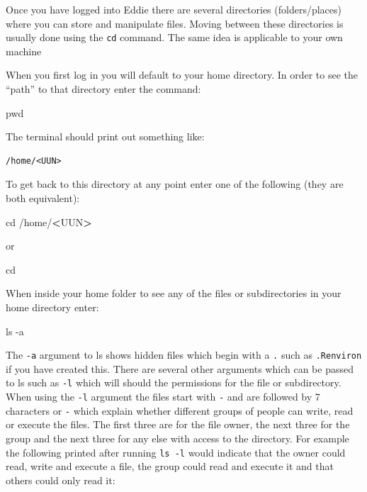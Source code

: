 \documentclass[]{book}
\newenvironment{Shaded}{\begin{snugshade}}{\end{snugshade}}
\newcommand{\BuiltInTok}[1]{#1}
\newcommand{\FunctionTok}[1]{\textcolor[rgb]{0.00,0.00,0.00}{#1}}
\newcommand{\NormalTok}[1]{#1}
\newcommand{\OperatorTok}[1]{\textcolor[rgb]{0.81,0.36,0.00}{\textbf{#1}}}
\begin{document}
Once you have logged into Eddie there are several directories (folders/places) where you can store and manipulate files. Moving between these directories is usually done using the \texttt{cd} command. The same idea is applicable to your own machine

When you first log in you will default to your home directory. In order to see the ``path'' to that directory enter the command:

\begin{Shaded}
\begin{Highlighting}[]
\BuiltInTok{pwd}
\end{Highlighting}
\end{Shaded}

The terminal should print out something like:

\begin{verbatim}
/home/<UUN>
\end{verbatim}

To get back to this directory at any point enter one of the following (they are both equivalent):

\begin{Shaded}
\begin{Highlighting}[]
\BuiltInTok{cd}\NormalTok{ /home/}\OperatorTok{<}\NormalTok{UUN}\OperatorTok{>}
\end{Highlighting}
\end{Shaded}

or

\begin{Shaded}
\begin{Highlighting}[]
\BuiltInTok{cd}\NormalTok{ ~}
\end{Highlighting}
\end{Shaded}

When inside your home folder to see any of the files or subdirectories in your home directory enter:

\begin{Shaded}
\begin{Highlighting}[]
\FunctionTok{ls}\NormalTok{ -a}
\end{Highlighting}
\end{Shaded}

The \texttt{-a} argument to ls shows hidden files which begin with a \texttt{.} such as \texttt{.Renviron} if you have created this. There are several other arguments which can be passed to ls such as \texttt{-l} which will should the permissions for the file or subdirectory. When using the \texttt{-l} argument the files start with \texttt{-} and are followed by 7 characters or \texttt{-} which explain whether different groups of people can write, read or execute the files. The first three are for the file owner, the next three for the group and the next three for any else with access to the directory. For example the following printed after running \texttt{ls\ -l} would indicate that the owner could read, write and execute a file, the group could read and execute it and that others could only read it:
\end{document}
